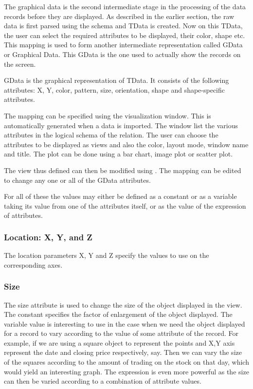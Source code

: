 The graphical data is the second intermediate stage in the processing
of the data records before they are displayed. As described in the
earlier section, the raw data is first parsed using the schema and
TData is created. Now on this TData, the user can select the required
attributes to be displayed, their color, shape etc. This mapping is
used to form another intermediate representation called GData or
Graphical Data. This GData is the one used to actually show the
records on the screen.

GData is the graphical representation of TData. It consists of the
following attributes: X, Y, color, pattern, size, orientation, shape
and shape-specific attributes.

The mapping can be specified using the visualization window. This is
automatically generated when a data is imported. The window list the
various attributes in the logical schema of the relation. The user can
choose the attributes to be displayed as views and also the color,
layout mode, window name and title. The plot can be done using a bar
chart, image plot or scatter plot.

The view thus defined can then be modified using . The mapping can be edited to change any one or all of the
GData attributes.

For all of these the values may either be defined as a constant or as
a variable taking its value from one of the attributes itself, or as
the value of the expression of attributes.

\subsubsection{Location: X, Y, and Z}

The location parameters X, Y and Z specify the values to use on the
corresponding axes.

\subsubsection{Size}

The size attribute is used to change the size of the object displayed
in the view. The constant specifies the factor of enlargement of the
object displayed. The variable value is interesting to use in the case
when we need the object displayed for a record to vary according to
the value of some attribute of the record. For example, if we are
using a square object to represent the points and X,Y axis represent
the date and closing price respectively, say. Then we can vary the
size of the squares according to the amount of trading on the stock on
that day, which would yield an interesting graph. The expression is
even more powerful as the size can then be varied according to a
combination of attribute values.

